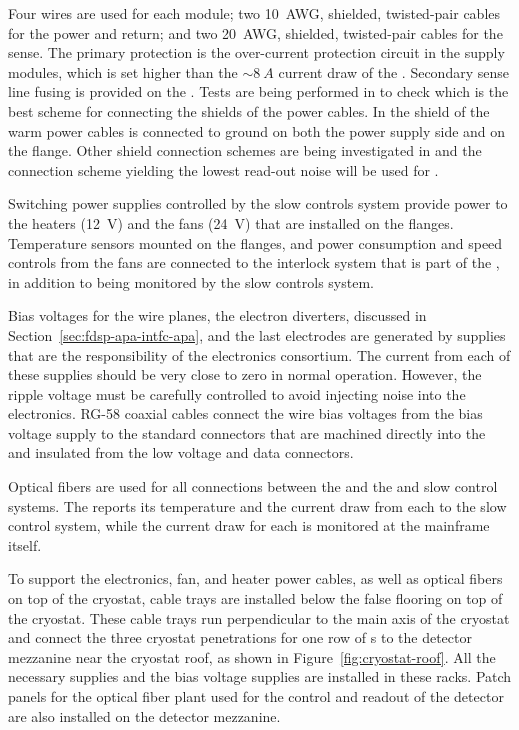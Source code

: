 Four wires are used for each  module; two \SI{10}{AWG}, shielded, twisted-pair 
cables for the power and return; and two \SI{20}{AWG}, shielded, twisted-pair 
cables for the sense. The primary protection is the over-current 
protection circuit in the  supply modules, which is set 
higher than the $\sim\SI{8}{A}$ current draw of the . 
Secondary sense line fusing is provided on the .  
Tests are being performed in  to check which is the
best scheme for connecting the shields of the power cables. In
 the shield of the warm power cables is connected to
ground on both the power supply side and on the  flange.
Other shield connection schemes are being investigated in 
and the connection scheme yielding the lowest read-out noise will be
used for .

Switching power supplies controlled by the slow controls system provide
power to the heaters (\SI{12}{V}) and the fans (\SI{24}{V}) that are 
installed on the  flanges. Temperature sensors mounted on the
flanges, and power consumption and speed controls from the fans are 
connected to the interlock system that is part of the , in
addition to being monitored by the slow controls system.

Bias voltages for the  wire planes, the electron diverters,
discussed in Section~\ref{sec:fdsp-apa-intfc-apa}, 
and the last  electrodes are generated by supplies that are 
the responsibility of the  electronics consortium.  The 
current from each of these supplies should be very close to zero in 
normal operation. However, the ripple voltage must be carefully 
controlled to avoid injecting noise into the  electronics.  
RG-58 coaxial cables connect the wire bias voltages from the bias voltage
supply to the standard  connectors that are machined directly 
into the  \fdth and insulated from the low voltage and 
data connectors.

Optical fibers are used for all connections between the  %
and the  and slow 
control systems.  The  reports its temperature 
and the current draw from each  to the slow control system, 
while the current draw for each  is monitored at the 
mainframe itself.

To support the electronics, fan, and heater power cables, as well 
as optical fibers on top of the cryostat, cable trays are installed
below the false flooring on top of the cryostat. These cable trays
run perpendicular to the main axis of the cryostat and connect the
three cryostat penetrations for one row of s to the detector
mezzanine near the cryostat roof, as shown in Figure~\ref{fig:cryostat-roof}.
All the necessary  supplies and %
the bias
voltage supplies are installed in these racks. Patch panels for
the optical fiber plant used for the control and readout of the
detector are also installed on the detector mezzanine.

